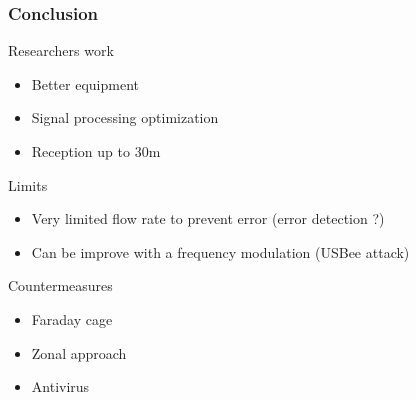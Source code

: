 \begin{frame}
\frametitle{Conclusion}
\begin{block}{Researchers work}
\begin{itemize}
\item Better equipment
\item Signal processing optimization
\item Reception up to 30m
\end{itemize}
\end{block}
\begin{block}{Limits}
\begin{itemize}
\item Very limited flow rate to prevent error (error detection ?)
\item Can be improve with a frequency modulation (USBee attack)
\end{itemize}
\end{block}
\begin{block}{Countermeasures}
\begin{itemize}
\item Faraday cage
\item Zonal approach
\item Antivirus
\end{itemize}
\end{block}
\end{frame}